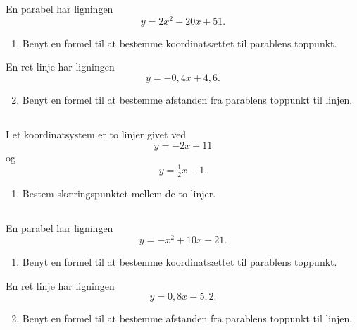 \documentclass[10pt,a4paper,table]{article}
\begin{document}
\section{}
\subsection{}
En parabel har ligningen
\[
    y = 2x^2 - 20x + 51 .
\]

\begin{enumerate}
    \item Benyt en formel til at bestemme koordinatsættet til parablens toppunkt.
\end{enumerate}

En ret linje har ligningen
\[
    y = -0{,}4x + 4{,}6 .
\]

\begin{enumerate}
    \setcounter{enumi}{1}
    \item Benyt en formel til at bestemme afstanden fra parablens toppunkt til linjen.
\end{enumerate}

\subsection{}
I et koordinatsystem er to linjer givet ved
\[
    y = -2x + 11
\]
og
\[
    y = \tfrac{1}{2}x - 1 .
\]

\begin{enumerate}
    \item Bestem sk\ae ringspunktet mellem de to linjer.
\end{enumerate}



\subsection{}
En parabel har ligningen
\[
    y = -x^2 + 10x - 21 .
\]

\begin{enumerate}
    \item Benyt en formel til at bestemme koordinats\ae{}ttet til parablens toppunkt.
\end{enumerate}

En ret linje har ligningen
\[
    y = 0{,}8x - 5{,}2 .
\]

\begin{enumerate}
    \setcounter{enumi}{1}
    \item Benyt en formel til at bestemme afstanden fra parablens toppunkt til linjen.
\end{enumerate}
\end{document}
